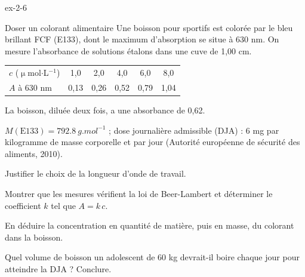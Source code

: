 \begin{blocLivre}{ex-2-6}
\begin{exercice}[2]{Doser un colorant alimentaire}
Une boisson pour sportifs est colorée par le bleu brillant FCF (E133), dont le maximum d'absorption se situe
à 630 nm. On mesure l'absorbance de solutions étalons dans une cuve de 1,00 cm.
\begin{center}\small\renewcommand{\arraystretch}{1.2}
\begin{tabular}{@{}l*{5}{c}@{}}\toprule
$c$ ($\upmu$mol$\cdot$L$^{-1}$) & 1,0 & 2,0 & 4,0 & 6,0 & 8,0\\
$A$ à 630 nm & 0,13 & 0,26 & 0,52 & 0,79 & 1,04\\\bottomrule
\end{tabular}\end{center}
La boisson, diluée deux fois, a une absorbance de 0,62.
\begin{donnees}
$M(\text{E133})=\qty{792,8}{g.mol^{-1}}$ ; dose journalière admissible (DJA) : 6 mg par kilogramme de masse
corporelle et par jour (Autorité européenne de sécurité des aliments, 2010).
\end{donnees}
\begin{questions}
\item Justifier le choix de la longueur d'onde de travail.
\item Montrer que les mesures vérifient la loi de Beer-Lambert et déterminer le coefficient $k$ tel que $A=k\,c$.
\item En déduire la concentration en quantité de matière, puis en masse, du colorant dans la boisson.
\item Quel volume de boisson un adolescent de 60 kg devrait-il boire chaque jour pour atteindre la DJA ? Conclure.
\end{questions}
\end{exercice}
\end{blocLivre}
